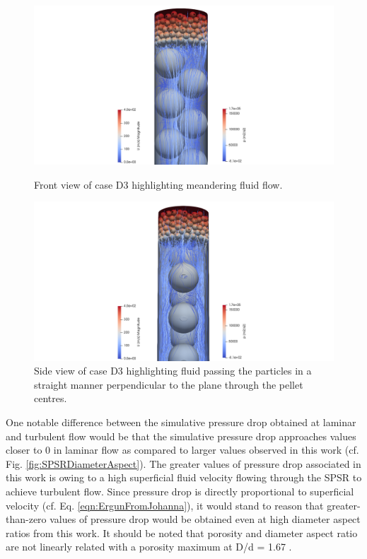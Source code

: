 \begin{figure} [H]
	\includegraphics[width=\linewidth]{Figures/visualisation/caseD3/StreamTracer_Sphere_FrontView_withunits_CaseD3.png}
	\caption{Front view of case D3 highlighting meandering fluid flow.}
	\label{fig:streamtracetube_p_D3}

	\includegraphics[width=\linewidth]{Figures/visualisation/caseD3/StreamTracer_Sphere_SideView_withunits_CaseD3.png}
	\caption{Side view of case D3 highlighting fluid passing the particles in a straight manner perpendicular
to the plane through the pellet centres.}
	\label{fig:streamtracetube_p_sideview_D3}
\end{figure}
One notable difference between the simulative pressure drop obtained at laminar and turbulent flow would be that the simulative pressure drop approaches values closer to 0 in laminar flow as compared to larger values observed in this work (cf. Fig. \ref{fig:SPSRDiameterAspect}). The greater values of pressure drop associated in this work is owing to a high superficial fluid velocity flowing through the SPSR to achieve turbulent flow. Since pressure drop is directly proportional to superficial velocity (cf. Eq. \ref{eqn:ErgunFromJohanna}), it would stand to reason that greater-than-zero values of pressure drop would be obtained even at high diameter aspect ratios from this work. It should be noted that porosity and diameter aspect ratio are not linearly related with a porosity maximum at D/d = 1.67 \cite{Govindarao1992}.


